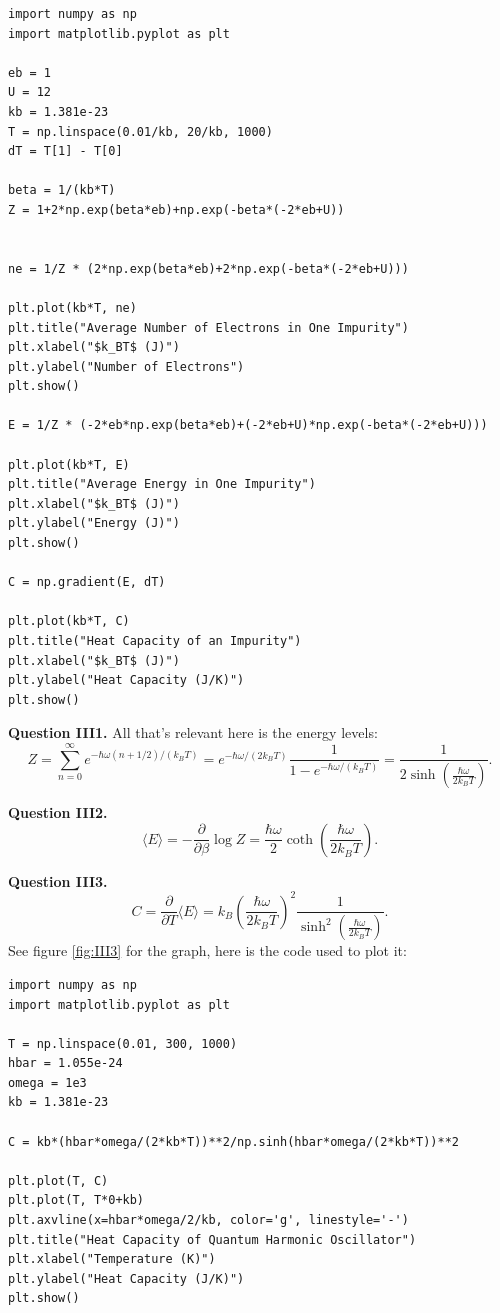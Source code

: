 \documentclass[letterpaper, reqno,11pt]{article}
\begin{document}
\begin{lstlisting}
import numpy as np
import matplotlib.pyplot as plt

eb = 1
U = 12
kb = 1.381e-23
T = np.linspace(0.01/kb, 20/kb, 1000)
dT = T[1] - T[0]

beta = 1/(kb*T)
Z = 1+2*np.exp(beta*eb)+np.exp(-beta*(-2*eb+U))


ne = 1/Z * (2*np.exp(beta*eb)+2*np.exp(-beta*(-2*eb+U)))

plt.plot(kb*T, ne)
plt.title("Average Number of Electrons in One Impurity")
plt.xlabel("$k_BT$ (J)")
plt.ylabel("Number of Electrons")
plt.show()

E = 1/Z * (-2*eb*np.exp(beta*eb)+(-2*eb+U)*np.exp(-beta*(-2*eb+U)))

plt.plot(kb*T, E)
plt.title("Average Energy in One Impurity")
plt.xlabel("$k_BT$ (J)")
plt.ylabel("Energy (J)")
plt.show()

C = np.gradient(E, dT)

plt.plot(kb*T, C)
plt.title("Heat Capacity of an Impurity")
plt.xlabel("$k_BT$ (J)")
plt.ylabel("Heat Capacity (J/K)")
plt.show()
\end{lstlisting}

{\medskip\noindent\bf Question III1.} All that's relevant here is the energy levels:
\[
Z = \sum_{n=0}^{\infty}e^{-\hbar\omega(n+1 /2)/(k_BT)}=e^{-\hbar\omega/(2k_BT)} \frac{1}{1-e^{-\hbar\omega /(k_BT)}}=\frac{1}{2\sinh\left( \frac{\hbar\omega}{2k_BT} \right) }
.\]

{\medskip\noindent\bf Question III2.}
\[
\langle E \rangle = -\frac{\partial}{\partial \beta}\log Z=\frac{\hbar\omega}{2}\coth\left( \frac{\hbar\omega}{2k_BT} \right) 
.\]

{\medskip\noindent\bf Question III3.} 
\[
  C=\frac{\partial}{\partial T}\langle E \rangle = k_B \left( \frac{\hbar\omega}{2k_BT} \right) ^2 \frac1{\sinh^2\left( \frac{\hbar\omega}{2k_BT} \right) }
.\]
See figure \ref{fig:III3} for the graph, here is the code used to plot it:
\begin{lstlisting}
import numpy as np
import matplotlib.pyplot as plt

T = np.linspace(0.01, 300, 1000)
hbar = 1.055e-24
omega = 1e3
kb = 1.381e-23

C = kb*(hbar*omega/(2*kb*T))**2/np.sinh(hbar*omega/(2*kb*T))**2

plt.plot(T, C)
plt.plot(T, T*0+kb)
plt.axvline(x=hbar*omega/2/kb, color='g', linestyle='-')
plt.title("Heat Capacity of Quantum Harmonic Oscillator")
plt.xlabel("Temperature (K)")
plt.ylabel("Heat Capacity (J/K)")
plt.show()

\end{lstlisting}
\end{document}
